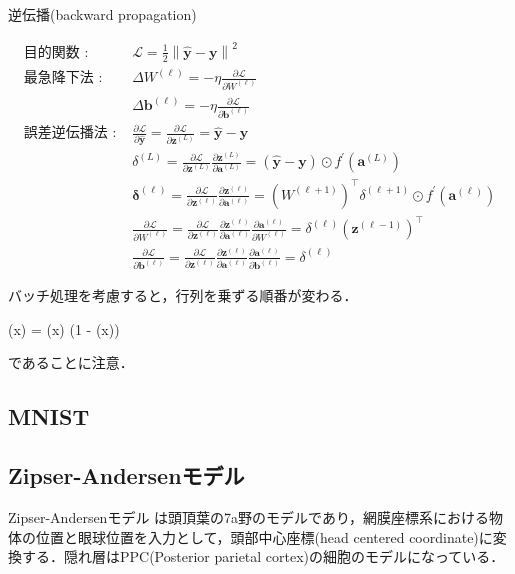 逆伝播(backward propagation)


\begin{align}
\text{目的関数 : }&\mathcal{L}=\frac{1}{2}\left\|\hat{\mathbf{y}}-\mathbf{y}\right\|^{2}\\
\text{最急降下法 : }&\Delta W^{(\ell)}=-\eta \frac{\partial \mathcal{L}}{\partial W^{(\ell)}}\\
&\Delta \mathbf{b}^{(\ell)}=-\eta \frac{\partial \mathcal{L}}{\partial \mathbf{b}^{(\ell)}}\\
\text{誤差逆伝播法 : }&\frac{\partial \mathcal{L}}{\partial \hat{\mathbf{y}}}=\frac{\partial \mathcal{L}}{\partial \mathbf{z}^{(L)}}=\hat{\mathbf{y}}-\mathbf{y}\\
&\delta^{(L)}=\frac{\partial \mathcal{L}}{\partial \mathbf{z}^{(L)}} \frac{\partial \mathbf{z}^{(L)}}{\partial \mathbf{a}^{(L)}}=\left(\hat{\mathbf{y}}-\mathbf{y}\right) \odot f^{\prime}\left(\mathbf{a}^{(L)}\right)\\
&\mathbf{\delta}^{(\ell)}=\frac{\partial \mathcal{L}}{\partial \mathbf{z}^{(\ell)}} \frac{\partial \mathbf{z}^{(\ell)}}{\partial \mathbf{a}^{(\ell)}}=\left(W^{(\ell+1)}\right)^\top \delta^{(\ell+1)} \odot f^{\prime}\left(\mathbf{a}^{(\ell)}\right)\\
&\frac{\partial \mathcal{L}}{\partial W^{(\ell)}}=\frac{\partial \mathcal{L}}{\partial \mathbf{z}^{(\ell)}} \frac{\partial \mathbf{z}^{(\ell)}}{\partial \mathbf{a}^{(\ell)}} \frac{\partial \mathbf{a}^{(\ell)}}{\partial W^{(\ell)}}=\delta^{(\ell)}\left(\mathbf{z}^{(\ell-1)}\right)^\top\\
&\frac{\partial \mathcal{L}}{\partial \mathbf{b}^{(\ell)}}=\frac{\partial \mathcal{L}}{\partial \mathbf{z}^{(\ell)}} \frac{\partial \mathbf{z}^{(\ell)}}{\partial \mathbf{a}^{(\ell)}} \frac{\partial \mathbf{a}^{(\ell)}}{\partial \mathbf{b}^{(\ell)}}=\delta^{(\ell)}
\end{align}


バッチ処理を考慮すると，行列を乗ずる順番が変わる．


 (x) = (x) \cdot \left(1 - (x)\right)

であることに注意．
\subsection{MNIST}
\subsection{Zipser-Andersenモデル}
Zipser-Andersenモデル \citep{Zipser1988-nc} は頭頂葉の7a野のモデルであり，網膜座標系における物体の位置と眼球位置を入力として，頭部中心座標(head centered coordinate)に変換する．隠れ層はPPC(Posterior parietal cortex)の細胞のモデルになっている．
